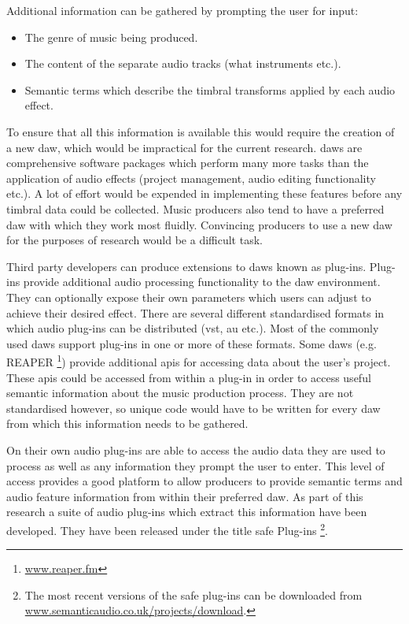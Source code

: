 		Additional information can be gathered by prompting the user for input:

		\begin{itemize}
			\item The genre of music being produced.
			\item The content of the separate audio tracks (what instruments etc.).
			\item Semantic terms which describe the timbral transforms applied by each audio
			      effect.
		\end{itemize}

		To ensure that all this information is available this would require the creation of a new \acrshort{daw},
		which would be impractical for the current research. \acrshort{daw}s are comprehensive software packages
		which perform many more tasks than the application of audio effects (project management, audio editing
		functionality etc.). A lot of effort would be expended in implementing these features before any timbral
		data could be collected. Music producers also tend to have a preferred \acrshort{daw} with which they work
		most fluidly. Convincing producers to use a new \acrshort{daw} for the purposes of research would be a
		difficult task.

		Third party developers can produce extensions to \acrshort{daw}s known as plug-ins. Plug-ins provide
		additional audio processing functionality to the \acrshort{daw} environment. They can optionally expose
		their own parameters which users can adjust to achieve their desired effect. There are several different
		standardised formats in which audio plug-ins can be distributed (\acrshort{vst}, \acrshort{au} etc.). Most
		of the commonly used \acrshort{daw}s support plug-ins in one or more of these formats. Some \acrshort{daw}s
		(e.g. REAPER \footnote{\href{http://www.reaper.fm}{www.reaper.fm}}) provide additional \acrshort{api}s for
		accessing data about the user's project. These \acrshort{api}s could be accessed from within a plug-in in
		order to access useful semantic information about the music production process. They are not standardised
		however, so unique code would have to be written for every \acrshort{daw} from which this information needs
		to be gathered. 
		
		On their own audio plug-ins are able to access the audio data they are used to process as well as any
		information they prompt the user to enter. This level of access provides a good platform to allow producers
		to provide semantic terms and audio feature information from within their preferred \acrshort{daw}. As part
		of this research a suite of audio plug-ins which extract this information have been developed. They have
		been released under the title \acrfull{safe} Plug-ins \footnote{The most recent versions of the
		\acrshort{safe} plug-ins can be downloaded from \href{http://www.semanticaudio.co.uk/projects/download/}
		{www.semanticaudio.co.uk/projects/download}.}.

